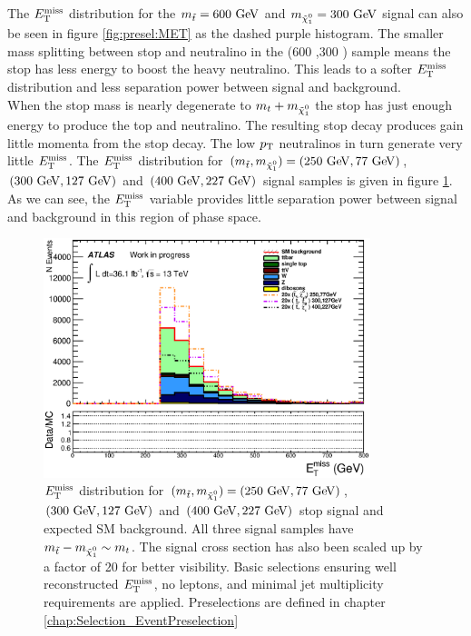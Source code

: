 \indent The $E_{\mathrm{T}}^{\mathrm{miss}}$ distribution for the $m_{\stop} = 600 \gev$ and $m_{\ninoone} = 300 \gev$ signal can also be seen in figure \ref{fig:presel:MET} as the dashed purple histogram.  The smaller mass splitting between stop and neutralino in the (600 \gev,300 \gev) sample means the stop has less energy to boost the heavy neutralino.  This leads to a softer $E_{\mathrm{T}}^{\mathrm{miss}}$ distribution and less separation power between signal and background.  \\

\indent   When the stop mass is nearly degenerate to $m_t + m_{\ninoone}$ the stop has just enough energy to produce the top and neutralino.  The resulting stop decay produces gain little momenta from the stop decay. The low $p_{\mathrm{T}}$ neutralinos in turn generate very little $E_{\mathrm{T}}^{\mathrm{miss}}$.  The $E_{\mathrm{T}}^{\mathrm{miss}}$ distribution for $(m_{\stop}, m_{\ninoone}) = (250 \gev,77 \gev)$, $(300 \gev, 127 \gev)$ and $(400 \gev, 227 \gev)$ signal samples is given in figure \ref{fig:presel:MET_diag}.  As we can see, the $E_{\mathrm{T}}^{\mathrm{miss}}$ variable provides little separation power between signal and background in this region of phase space. \\

\begin{figure}[h!]
\centering
    \includegraphics[width=0.85\textwidth]{figures/plotSR/SR_eT_miss_0SR.eps}\hspace{0.05\textwidth}
\caption{ $E_{\mathrm{T}}^{\mathrm{miss}}$ distribution for $(m_{\stop}, m_{\ninoone}) = (250 \gev,77 \gev)$, $(300 \gev, 127 \gev)$ and $(400 \gev, 227 \gev)$ stop signal and expected SM background.  All three signal samples have $m_{\stop}-m_{\ninoone} \sim m_t$.  The signal cross section has also been scaled up by a factor of 20 for better visibility.  Basic selections ensuring well reconstructed $E_{\mathrm{T}}^{\mathrm{miss}}$, no leptons, and minimal jet multiplicity requirements are applied.  Preselections are defined in chapter \ref{chap:Selection_EventPreselection} }
\label{fig:presel:MET_diag}
\end{figure}

